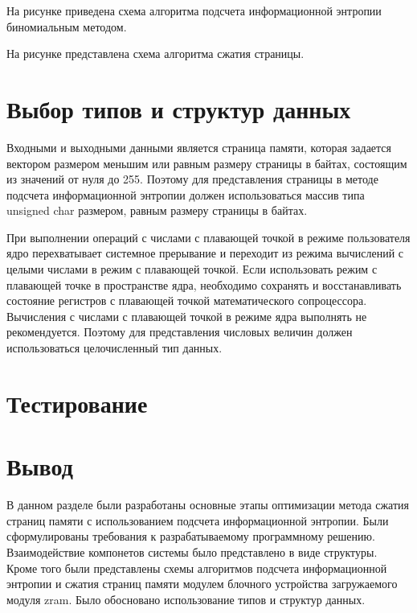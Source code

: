 На рисунке  приведена схема алгоритма подсчета информационной энтропии биномиальным методом.

На рисунке  представлена схема алгоритма сжатия страницы.

\section{Выбор типов и структур данных}

Входными и выходными данными является страница памяти, которая задается вектором размером меньшим или равным размеру страницы в байтах, состоящим из значений от нуля до 255. Поэтому для представления страницы в методе подсчета информационной энтропии должен использоваться массив типа unsigned char размером, равным размеру страницы в байтах.

При выполнении операций с числами с плавающей точкой в режиме пользователя ядро перехватывает системное прерывание и переходит из режима вычислений с целыми числами в режим с плавающей точкой. Если использовать режим с плавающей точке в пространстве ядра, необходимо сохранять и восстанавливать состояние регистров с плавающей точкой математического сопроцессора. Вычисления с числами с плавающей точкой в режиме ядра выполнять не рекомендуется. Поэтому для представления числовых величин должен использоваться целочисленный тип данных. 

\section{Тестирование}

\section*{Вывод}

В данном разделе были разработаны основные этапы оптимизации метода сжатия страниц памяти с использованием подсчета информационной энтропии. Были сформулированы требования к разрабатываемому программному решению. Взаимодействие компонетов системы было представлено в виде структуры. Кроме того были представлены схемы алгоритмов подсчета информационной энтропии и сжатия страниц памяти модулем блочного устройства загружаемого модуля zram. Было обосновано использование типов и структур данных.
